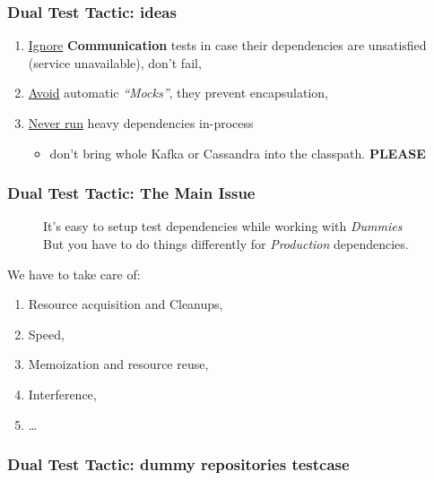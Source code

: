 \documentclass[usenames,dvipsnames,aspectratio=169]{beamer}
\begin{document}
\begin{frame}
  \frametitle{Dual Test Tactic: ideas}

  \begin{enumerate}
    \item \underline{Ignore} \textbf{Communication} tests in case their dependencies are unsatisfied (service unavailable), don't fail,
    \item \underline{Avoid} automatic \textit{``Mocks''}, they prevent encapsulation,
    \item \underline{Never run} heavy dependencies in-process
    \begin{itemize}
      \item don't bring whole Kafka or Cassandra into the classpath. \textbf{PLEASE}
    \end{itemize}
  \end{enumerate}
\end{frame}

\begin{frame}
  \frametitle{Dual Test Tactic: The Main Issue}

  \begin{figure}
  It's easy to setup test dependencies while working with \textit{Dummies} \\
  But you have to do things differently for \textit{Production} dependencies.
  \end{figure}

  We have to take care of:
  \begin{enumerate}
    \item Resource acquisition and Cleanups,
    \item Speed,
    \item Memoization and resource reuse,
    \item Interference,
    \item \dots
  \end{enumerate}
\end{frame}

\begin{frame}
  \frametitle{Dual Test Tactic: dummy repositories testcase}
  \begin{figure}
   \end{figure}
\end{frame}
\end{document}
